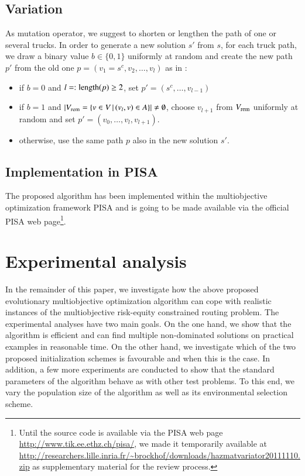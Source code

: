 \documentclass[preprint,12pt]{elsarticle}
\begin{document}
\subsection{Variation}\label{sec:variation}
As mutation operator, we suggest to shorten or lengthen the path of one or several trucks. In order to generate a new solution $s'$ from $s$, for each truck path, we draw a binary value $b\in\{0,1\}$ uniformly at random and create the new path $p'$ from the old one $p=(v_1=s^c,v_2,\ldots, v_l)$ as in \citep{horo2009a}:
\begin{itemize}
	\item if $b = 0$ and $l=:\textnormal{length}(p)\geq 2$, set $p' = (s^c, \ldots, v_{l-1})$	
	\item if $b = 1$ and $|V_{\textnormal{\scriptsize rem}}=\{v \in V \,|\, (v_{l}, v) \in A\}| \neq\emptyset$, choose $v_{l+1}$ from $V_{\textnormal{\scriptsize rem}}$ uniformly at random and set $p' = (v_0, \ldots, v_l, v_{l+1})$.
	\item otherwise, use the same path $p$ also in the new solution $s'$.
\end{itemize}

\subsection{Implementation in PISA}
The proposed algorithm has been implemented within the multiobjective optimization framework PISA \citep{bltz2003a} and is going to be made available via the official PISA web page\footnote{Until the source code is available via the PISA web page \url{http://www.tik.ee.ethz.ch/pisa/}, we made it temporarily available at \url{http://researchers.lille.inria.fr/~brockhof/downloads/hazmatvariator20111110.zip} as supplementary material for the review process.}.


\section{Experimental analysis}
In the remainder of this paper, we investigate how the above proposed evolutionary multiobjective optimization algorithm can cope with realistic instances of the multiobjective risk-equity constrained routing problem. The experimental analyses have two main goals. On the one hand, we show that the algorithm is efficient and can find multiple non-dominated solutions on practical examples in reasonable time. On the other hand, we investigate which of the two proposed initialization schemes is favourable and when this is the case. In addition, a few more experiments are conducted to show that the standard parameters of the algorithm behave as with other test problems. To this end, we vary the population size of the algorithm as well as its environmental selection scheme.
\end{document}
